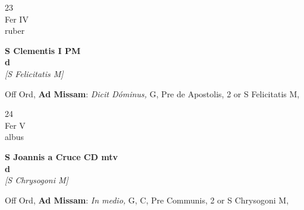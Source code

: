 \documentclass[10pt, openany]{book}
\begin{document}
        \begin{center}
            \begin{minipage}{3.5in}
                \vspace{2em}
                \begin{minipage}{0.5in}
                    {\Huge 23} \\
                    {\normalsize Fer IV} \\
                    {\normalsize ruber}
                \end{minipage}
                \begin{minipage}{3.0in}
                    \textbf{ \large S Clementis I PM \\
                    \textnormal{\normalsize d}} \\ \textit{[S Felicitatis M]} \\ 
                \end{minipage}
                \begin{justify}Off Ord, \textbf{Ad Missam}: \textit{Dicit Dóminus,} G, Pre de Apostolis, 2 or S Felicitatis M,   
                \end{justify}
            \end{minipage}
        \end{center}
    
        \begin{center}
            \begin{minipage}{3.5in}
                \vspace{2em}
                \begin{minipage}{0.5in}
                    {\Huge 24} \\
                    {\normalsize Fer V} \\
                    {\normalsize albus}
                \end{minipage}
                \begin{minipage}{3.0in}
                    \textbf{ \large S Joannis a Cruce CD mtv \\
                    \textnormal{\normalsize d}} \\ \textit{[S Chrysogoni M]} \\ 
                \end{minipage}
                \begin{justify}Off Ord, \textbf{Ad Missam}: \textit{In medio,} G, C, Pre Communis, 2 or S Chrysogoni M,   
                \end{justify}
            \end{minipage}
        \end{center}
    
\end{document}
